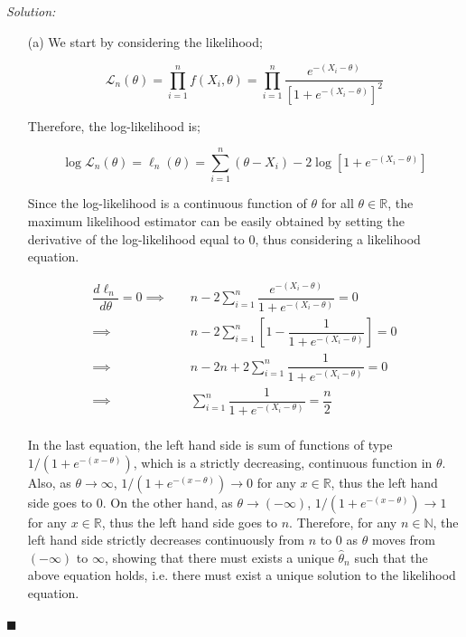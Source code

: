 \documentclass[12pt]{article}
\newcommand{\R}{\mathbb{R}}
\newcommand{\N}{\mathbb{N}}
\theoremstyle{definition}
\newenvironment{answer}{\textit{Solution: }\quad }{ \hfill $\blacksquare$}
\numberwithin{equation}{section}
\begin{document}
\begin{answer}
    
    \begin{enumerate}
        \item[(a)] We start by considering the likelihood;
        
        $$
        \mathcal{L}_n(\theta) = \prod_{i=1}^{n} f(X_i, \theta) = \prod_{i=1}^{n} \dfrac{e^{-(X_i - \theta)}}{\left[ 1 + e^{-(X_i - \theta)} \right]^2}
        $$

        Therefore, the log-likelihood is;

        $$
        \log\mathcal{L}_n(\theta) = \ell_n(\theta) = \sum_{i=1}^{n} (\theta - X_i) - 2\log\left[ 1 + e^{-(X_i - \theta)} \right]
        $$

        Since the log-likelihood is a continuous function of $\theta$ for all $\theta \in \R$, the maximum likelihood estimator can be easily obtained by setting the derivative of the log-likelihood equal to 0, thus considering a likelihood equation.

        \begin{align*}
            \dfrac{d\ell_n}{d\theta} = 0
            \implies \quad & n - 2 \sum_{i=1}^{n} \dfrac{e^{-(X_i - \theta)}}{1 + e^{-(X_i - \theta)}} = 0\\
            \implies \quad & n - 2 \sum_{i = 1}^{n} \left[ 1 - \dfrac{1}{1 + e^{-(X_i - \theta)}} \right] = 0\\
            \implies \quad & n - 2n + 2\sum_{i=1}^{n} \dfrac{1}{1 + e^{-(X_i - \theta)}} = 0\\
            \implies \quad & \sum_{i=1}^{n} \dfrac{1}{1 + e^{-(X_i - \theta)}} = \dfrac{n}{2}\\
        \end{align*}

        In the last equation, the left hand side is sum of functions of type $1/(1 + e^{-(x - \theta)})$, which is a strictly decreasing, continuous function in $\theta$. Also, as $\theta \rightarrow \infty$, $1/(1 + e^{-(x - \theta)}) \rightarrow 0$ for any $x \in \R$, thus the left hand side goes to $0$. On the other hand, as $\theta \rightarrow (-\infty)$, $1/(1 + e^{-(x - \theta)}) \rightarrow 1$ for any $x \in \R$, thus the left hand side goes to $n$. Therefore, for any $n \in \N$, the left hand side strictly decreases continuously from $n$ to $0$ as $\theta$ moves from $(-\infty)$ to $\infty$, showing that there must exists a unique $\widehat{\theta}_n$ such that the above equation holds, i.e. there must exist a unique solution to the likelihood equation.


\end{enumerate}
\end{answer}
\end{document}
